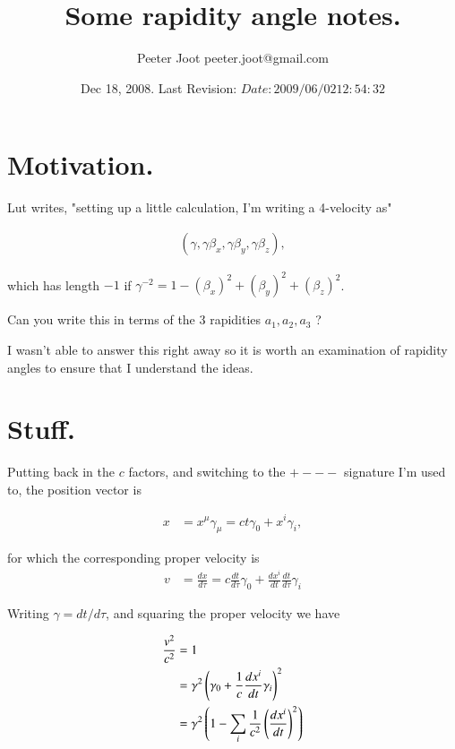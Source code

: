 \documentclass{article}
\title{ Some rapidity angle notes. }
\author{Peeter Joot \quad peeter.joot@gmail.com}
\date{ Dec 18, 2008.  Last Revision: $Date: 2009/06/02 12:54:32 $ }
\begin{document}
\maketitle{}

\section{ Motivation. }

Lut writes, "setting up a little calculation, I'm writing a 4-velocity as"
 
\begin{align*}
( \gamma, \gamma \beta_x, \gamma \beta_y, \gamma \beta_z ),
\end{align*}
 
which has length $-1$ if $\gamma^{-2} = 1 - (\beta_x)^2+(\beta_y)^2+(\beta_z)^2$.
 
Can you write this in terms of the 3 rapidities $a_1, a_2, a_3$ ?

I wasn't able to answer this right away so it is worth an examination
of rapidity angles to ensure that I understand the ideas.

\section{ Stuff. }

Putting back in the $c$ factors, and switching to the $+---$ signature I'm used to, the position
vector is

\begin{align*}
x &= x^\mu \gamma_\mu = ct \gamma_0 + x^i \gamma_i,
\end{align*}

for which the corresponding proper velocity is
\begin{align*}
v &= \frac{dx}{d\tau} = c \frac{dt}{d\tau} \gamma_0 + \frac{dx^i}{dt} \frac{dt}{d\tau} \gamma_i
\end{align*}

Writing $\gamma = dt/d\tau$, and squaring the proper velocity we have

\begin{align*}
\frac{v^2}{c^2}
&= 1 \\
&= \gamma^2 \left(\gamma_0 + \frac{1}{c}\frac{dx^i}{dt} \gamma_i\right)^2 \\
&= \gamma^2 \left(1 - \sum_i \frac{1}{c^2} \left(\frac{dx^i}{dt}\right)^2 \right) \\
\end{align*}
\end{document}
